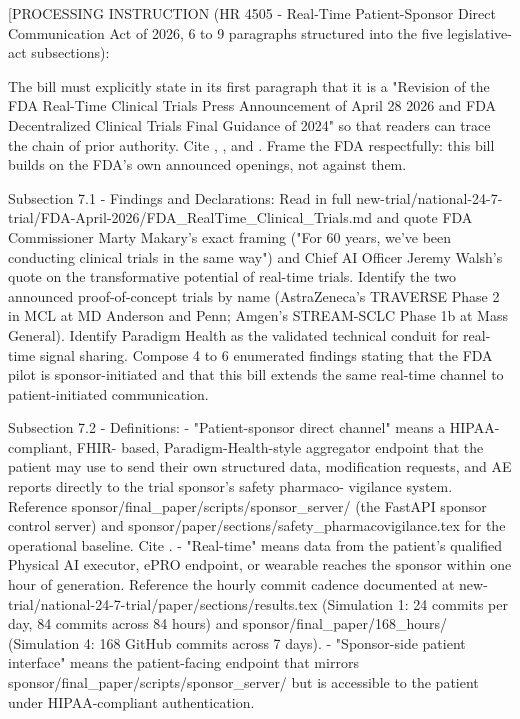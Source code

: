 
[PROCESSING INSTRUCTION (HR 4505 - Real-Time Patient-Sponsor Direct
Communication Act of 2026, 6 to 9 paragraphs structured into the five
legislative-act subsections):

The bill must explicitly state in its first paragraph that it is a
"Revision of the FDA Real-Time Clinical Trials Press Announcement of
April 28 2026 and FDA Decentralized Clinical Trials Final Guidance of
2024" so that readers can trace the chain of prior authority. Cite
\cite{fda_rtct_press_2026}, \cite{fda_dct_guidance_2024}, and
\cite{fda_dhts_drug_development_2026}. Frame the FDA respectfully:
this bill builds on the FDA's own announced openings, not against
them.

Subsection 7.1 - Findings and Declarations: Read in full
new-trial/national-24-7-trial/FDA-April-2026/FDA\_RealTime\_Clinical\_Trials.md
and quote FDA Commissioner Marty Makary's exact framing ("For 60
years, we've been conducting clinical trials in the same way") and
Chief AI Officer Jeremy Walsh's quote on the transformative potential
of real-time trials. Identify the two announced proof-of-concept
trials by name (AstraZeneca's TRAVERSE Phase 2 in MCL at MD Anderson
and Penn; Amgen's STREAM-SCLC Phase 1b at Mass General). Identify
Paradigm Health as the validated technical conduit for real-time
signal sharing. Compose 4 to 6 enumerated findings stating that the
FDA pilot is sponsor-initiated and that this bill extends the same
real-time channel to patient-initiated communication.

Subsection 7.2 - Definitions:
- "Patient-sponsor direct channel" means a HIPAA-compliant, FHIR-
  based, Paradigm-Health-style aggregator endpoint that the patient
  may use to send their own structured data, modification requests,
  and AE reports directly to the trial sponsor's safety pharmaco-
  vigilance system. Reference
  sponsor/final\_paper/scripts/sponsor\_server/ (the FastAPI sponsor
  control server) and sponsor/paper/sections/safety\_pharmacovigilance.tex
  for the operational baseline. Cite \cite{kawchak_2026_19396256}.
- "Real-time" means data from the patient's qualified Physical AI
  executor, ePRO endpoint, or wearable reaches the sponsor within
  one hour of generation. Reference the hourly commit cadence
  documented at new-trial/national-24-7-trial/paper/sections/results.tex
  (Simulation 1: 24 commits per day, 84 commits across 84 hours)
  and sponsor/final\_paper/168\_hours/ (Simulation 4: 168 GitHub commits
  across 7 days).
- "Sponsor-side patient interface" means the patient-facing endpoint
  that mirrors sponsor/final\_paper/scripts/sponsor\_server/ but is
  accessible to the patient under HIPAA-compliant authentication.

